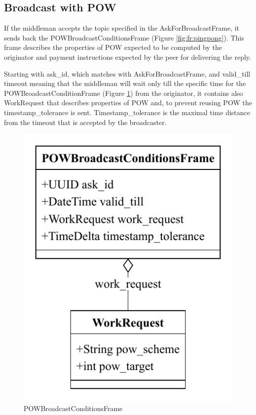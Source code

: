\documentclass{article}
\begin{document}
\subsection{Broadcast with POW} 

If the middleman accepts the topic specified in the AskForBroadcastFrame, it sends back the POWBroadcastConditionsFrame (Figure \ref{fig:fr:pingpong}). This frame describes the properties of POW expected to be computed by the originator and payment instructions expected by the peer for delivering the reply.

Starting with ask\_id, which matches with AskForBroadcastFrame, and valid\_till timeout meaning that the middleman will wait only till the specific time for the POWBroadcastConditionFrame (Figure \ref{fig:fr:powbroadcastcondition}) from the originator, it contains also WorkRequest that describes properties of POW and, to prevent reusing POW the timestamp\_tolerance is sent. Timestamp\_tolerance is the maximal time distance from the timeout that is accepted by the broadcaster.

\begin{figure}
	\centering
	\includegraphics[scale=0.7]{POWBroadcastCondition.pdf}
	\caption{POWBroadcastConditionsFrame}
	\label{fig:fr:powbroadcastcondition}
\end{figure}
\end{document}

